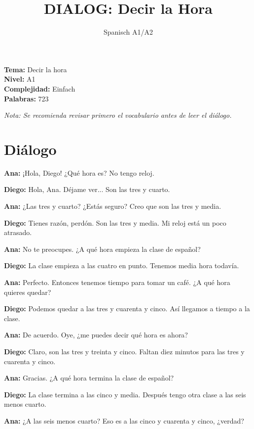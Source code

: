 \documentclass[12pt,a4paper]{article}
\begin{document}
\title{\textbf{DIALOG: Decir la Hora}}
\author{Spanisch A1/A2}
\date{}
\maketitle

\textbf{Tema:} Decir la hora \\
\textbf{Nivel:} A1 \\
\textbf{Complejidad:} Einfach \\
\textbf{Palabras:} 723

\vspace{1em}

\textit{Nota: Se recomienda revisar primero el vocabulario antes de leer el diálogo.}

\vspace{1em}

\section*{Diálogo}

\textbf{Ana:} ¡Hola, Diego! ¿Qué hora es? No tengo reloj.

\textbf{Diego:} Hola, Ana. Déjame ver... Son las tres y cuarto.

\textbf{Ana:} ¿Las tres y cuarto? ¿Estás seguro? Creo que son las tres y media.

\textbf{Diego:} Tienes razón, perdón. Son las tres y media. Mi reloj está un poco atrasado.

\textbf{Ana:} No te preocupes. ¿A qué hora empieza la clase de español?

\textbf{Diego:} La clase empieza a las cuatro en punto. Tenemos media hora todavía.

\textbf{Ana:} Perfecto. Entonces tenemos tiempo para tomar un café. ¿A qué hora quieres quedar?

\textbf{Diego:} Podemos quedar a las tres y cuarenta y cinco. Así llegamos a tiempo a la clase.

\textbf{Ana:} De acuerdo. Oye, ¿me puedes decir qué hora es ahora?

\textbf{Diego:} Claro, son las tres y treinta y cinco. Faltan diez minutos para las tres y cuarenta y cinco.

\textbf{Ana:} Gracias. ¿A qué hora termina la clase de español?

\textbf{Diego:} La clase termina a las cinco y media. Después tengo otra clase a las seis menos cuarto.

\textbf{Ana:} ¿A las seis menos cuarto? Eso es a las cinco y cuarenta y cinco, ¿verdad?
\end{document}
